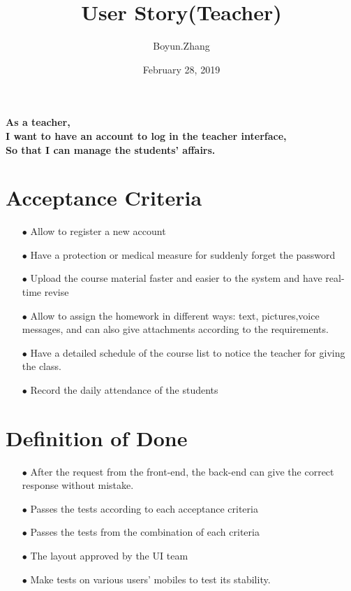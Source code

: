 \documentclass{article}
\begin{document}
\title{User Story(Teacher)}
\author{Boyun.Zhang}
\date{February 28, 2019}
\maketitle
\paragraph{\large As a teacher, \\
I want to have an account to log in the teacher interface,\\
So that I can manage the students' affairs.}

\section*{Acceptance Criteria}
\begin{itemize}
\item[$\bullet$] Allow to register a new account
\item[$\bullet$] Have a protection or medical measure for suddenly forget the password
\item[$\bullet$] Upload the course material faster and easier to the system and have real-time revise 
\item[$\bullet$] Allow to assign the homework in different ways: text, pictures,voice messages, and can also give attachments according to the requirements.
\item[$\bullet$] Have a detailed schedule of the course list to notice the teacher for giving the class.
\item[$\bullet$] Record the daily attendance of the students
\end{itemize}

\section*{Definition of Done}
\begin{itemize}
\item[$\bullet$] After the request from the front-end, the back-end can give the correct response without mistake.
\item[$\bullet$] Passes the tests according to each acceptance criteria
\item[$\bullet$] Passes the tests from the combination of each criteria
\item[$\bullet$] The layout approved by the UI team
\item[$\bullet$] Make tests on various users' mobiles to test its stability.
\end{itemize}
\end{document}
